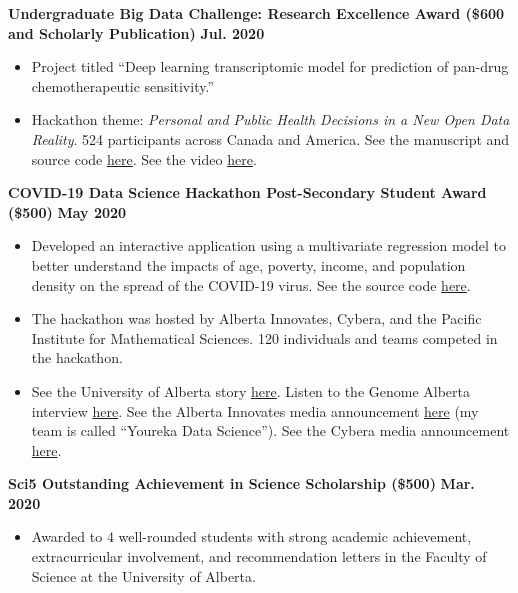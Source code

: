 \documentclass{article}
\begin{document}
\textbf{Undergraduate Big Data Challenge: Research Excellence Award
(\$600 and Scholarly Publication)} \hfill \textbf{Jul. 2020}
\begin{itemize}
    \item Project titled ``Deep learning transcriptomic model for prediction of pan-drug chemotherapeutic sensitivity.''
    \item Hackathon theme: \textit{Personal and Public Health Decisions in a New Open Data Reality}. 524 participants across Canada and America. See the manuscript and source code \href{https://github.com/tig3r66/youreka_genes}{here}. See the video \href{https://youtu.be/MTOuXgh4zqU}{here}.
\end{itemize}
    \textbf{COVID-19 Data Science Hackathon Post-Secondary Student Award (\$500)} \hfill \textbf{May 2020}
    \begin{itemize}
        \item Developed an interactive application using a multivariate regression model to better understand the impacts of age, poverty, income, and population density on the spread of the COVID-19 virus. See the source code \href{https://yourekacanada.org/index}{here}.
        \item The hackathon was hosted by Alberta Innovates, Cybera, and the Pacific Institute for Mathematical Sciences. 120 individuals and teams competed in the hackathon.
        \item See the University of Alberta story \href{https://www.folio.ca/students-develop-online-tool-to-predict-covid-19-spread-based-on-demographics/}{here}. Listen to the Genome Alberta interview \href{https://genomealberta.ca/genomics/genomics_blog_08182001.aspx}{here}. See the Alberta Innovates media announcement \href{https://albertainnovates.ca/impact/newsroom/flattening-the-curve-and-promoting-economic-recovery-through-innovation}{here} (my team is called ``Youreka Data Science''). See the Cybera media announcement \href{https://www.cybera.ca/news-and-events/news/covid-19-data-science-hackathon-winners/}{here}.
    \end{itemize}
    \textbf{Sci5 Outstanding Achievement in Science Scholarship (\$500)} \hfill \textbf{Mar. 2020}
    \begin{itemize}
        \item Awarded to 4 well-rounded students with strong academic achievement, extracurricular involvement, and recommendation letters in the Faculty of Science at the University of Alberta.
    \end{itemize}
\end{document}
